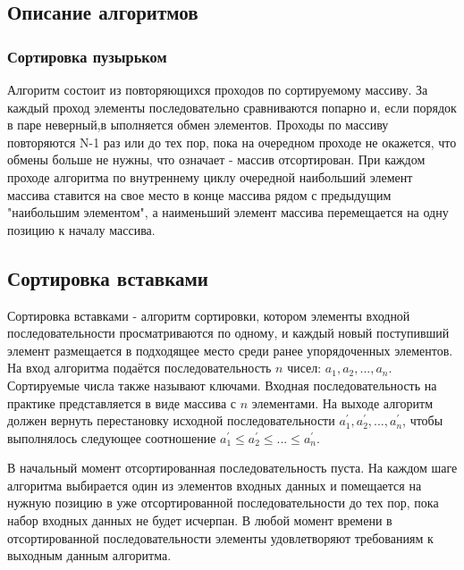 \documentclass[a4paper,12pt]{article}
\begin{document}
    \newpage
	\begin{center}
	        \subsection{Описание алгоритмов}
    \end{center}
\subsubsection{Сортировка пузырьком}

Алгоритм состоит из повторяющихся проходов по сортируемому массиву. За каждый проход элементы последовательно сравниваются попарно и, если порядок в паре неверный,в ыполняется обмен элементов. Проходы по массиву повторяются N-1 раз или до тех пор, пока на очередном проходе не окажется, что обмены больше не нужны, что означает - массив отсортирован. При каждом проходе алгоритма по внутреннему циклу очередной наибольший элемент массива ставится на свое место в конце массива рядом с предыдущим "наибольшим элементом", а наименьший элемент массива перемещается на одну позицию к началу массива.

\subsection{Сортировка вставками}

Сортировка вставками - алгоритм сортировки, котором элементы входной последовательности просматриваются по одному, и каждый новый поступивший элемент размещается в подходящее место среди ранее упорядоченных элементов\cite{litlink1}.\\
На вход алгоритма подаётся последовательность $n$ чисел:
$a_{1},a_{2},...,a_{n}$. Сортируемые числа также называют ключами.
Входная последовательность на практике представляется в виде массива с $n$ элементами. На выходе алгоритм должен вернуть перестановку
исходной последовательности $a_{1}^{'},a_{2}^{'},...,a_{n}^{'}$,
чтобы выполнялось следующее соотношение $a_{1}^{'}\leq a_{2}^{'}\leq ...\leq a_{n}^{'}$\cite{litlink2}.

В начальный момент отсортированная последовательность пуста. На каждом шаге алгоритма выбирается один из элементов входных данных и помещается на нужную позицию в уже отсортированной последовательности до тех пор, пока набор входных данных не будет исчерпан. В любой момент времени в отсортированной последовательности элементы удовлетворяют требованиям к выходным данным алгоритма\cite{litlink2}. 
\end{document}
